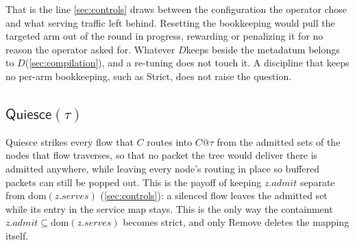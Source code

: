 \documentclass[sigplan,anonymous,review,nonacm]{acmart}
\newcommand{\notation}[1]{\ensuremath{#1}\ifmmode\else\xspace\fi}
\newcommand{\disc}{\notation{D}}
\newcommand{\Strict}{\textsf{Strict}}
\newcommand{\Quiesce}{\textsf{Quiesce}}
\newcommand{\Remove}{\textsf{Remove}}
\begin{document}
That is the line \cref{sec:controls} draws between the configuration the operator chose and what serving traffic left behind.
Resetting the bookkeeping would pull the targeted arm out of the round in progress, rewarding or penalizing it for no reason the operator asked for.
Whatever \disc keeps beside the metadatum belongs to \disc (\cref{sec:compilation}), and a re-tuning does not touch it.
A discipline that keeps no per-arm bookkeeping, such as \Strict, does not raise the question.

\subsection{\texorpdfstring{\(\Quiesce(\tau)\)}{Quiesce}}\label{sec:quiesce}


\Quiesce{} strikes every flow that \(C\) routes into \(C@\tau\) from the admitted sets of the nodes that flow traverses, so that no packet the tree would deliver there is admitted anywhere, while leaving every node's routing in place so buffered packets can still be popped out.
This is the payoff of keeping \(\mathit{z}.\mathit{admit}\) separate from \(\mathrm{dom}(\mathit{z}.\mathit{serves})\) (\cref{sec:controls}): a silenced flow leaves the admitted set while its entry in the service map stays.
This is the only way the containment \(\mathit{z}.\mathit{admit} \subseteq \mathrm{dom}(\mathit{z}.\mathit{serves})\) becomes strict, and only \Remove{} deletes the mapping itself.
\end{document}
